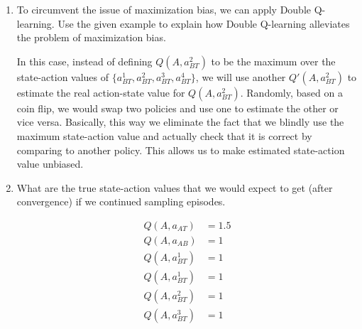 \documentclass{exam}
\begin{document}
\begin{problem}
\begin{enumerate}
\begin{solutionorlines}[2in]
    \end{solutionorlines}
    \item To circumvent the issue of maximization bias, we can apply Double Q-learning. Use the given example to explain how Double Q-learning alleviates the problem of maximization bias.
    \begin{solutionorlines}[2in] 
    In this case, instead of defining $Q(A, a_{BT}^2)$ to be the maximum over the state-action values of $\{a_{BT}^1, a_{BT}^2, a_{BT}^3, a_{BT}^4\}$, we will use another $Q'(A, a_{BT}^2)$ to estimate the real action-state value for $Q(A, a_{BT}^2)$. Randomly, based on a coin flip, we would swap two policies and use one to estimate the other or vice versa. Basically, this way we eliminate the fact that we blindly use the maximum state-action value and actually check that it is correct by comparing to another policy. This allows us to make estimated state-action value unbiased. 
    \end{solutionorlines}
    \item What are the true state-action values that we would expect to get (after convergence) if we continued sampling episodes.
    \begin{solutionorlines}[2in]
    \begin{align*}
        Q(A, a_{AT}) &= 1.5\\
        Q(A, a_{AB}) &= 1\\
        Q(A, a_{BT}^1) &= 1\\
        Q(A, a_{BT}^1) &= 1\\
        Q(A, a_{BT}^2) &= 1\\
        Q(A, a_{BT}^3) &= 1\\
    \end{align*}
    \end{solutionorlines}
\end{enumerate}
\end{problem}

\end{document}
